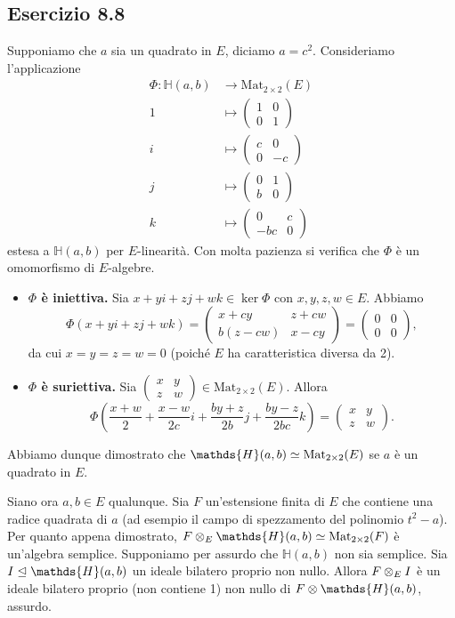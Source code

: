 \documentclass[a4paper]{article}
\newcommand*{\HH}{\mathds{H}}
\newcommand*{\Mat}{\text{Mat}_{2\times2}}
\newcommand*{\mattwo}[4]{\begin{pmatrix}#1&#2\\#3&#4\end{pmatrix}}
\begin{document}
\subsection*{Esercizio 8.8}
Supponiamo che $a$ sia un quadrato in $E$, diciamo $a=c^2$. Consideriamo l'applicazione
\begin{align*}
\Phi:\HH(a,b)&\longrightarrow\Mat(E)\\
1&\longmapsto\mattwo{1}{0}{0}{1}\\
i&\longmapsto\mattwo{c}{0}{0}{-c}\\
j&\longmapsto\mattwo{0}{1}{b}{0}\\
k&\longmapsto\mattwo{0}{c}{-bc}{0}
\end{align*}
estesa a $\HH(a,b)$ per $E$-linearità. Con molta pazienza si verifica che $\Phi$ è un omomorfismo di $E$-algebre.
\begin{itemize}
\item \textbf{$\Phi$ è iniettiva.} Sia $x+yi+zj+wk\in\ker\Phi$ con $x,y,z,w\in E$. Abbiamo
$$
\Phi(x+yi+zj+wk)=\mattwo{x+cy}{z+cw}{b(z-cw)}{x-cy}=\mattwo{0}{0}{0}{0},
$$
da cui $x=y=z=w=0$ (poiché $E$ ha caratteristica diversa da 2).
\item \textbf{$\Phi$ è suriettiva.} Sia $\mattwo{x}{y}{z}{w}\in\Mat(E)$. Allora
$$
\Phi\left(\frac{x+w}{2}+\frac{x-w}{2c}i+\frac{by+z}{2b}j+\frac{by-z}{2bc}k\right)=\mattwo{x}{y}{z}{w}.
$$
\end{itemize}
Abbiamo dunque dimostrato che $\HH(a,b)\iso\Mat(E)$ se $a$ è un quadrato in $E$.

Siano ora $a,b\in E$ qualunque. Sia $F$ un'estensione finita di $E$ che contiene una radice quadrata di $a$ (ad esempio il campo di spezzamento del polinomio $t^2-a$). Per quanto appena dimostrato, $F\tensor_E\HH(a,b)\iso\Mat(F)$ è un'algebra semplice. Supponiamo per assurdo che $\HH(a,b)$ non sia semplice. Sia $I\ideal\HH(a,b)$ un ideale bilatero proprio non nullo. Allora $F\otimes_E I$ è un ideale bilatero proprio (non contiene 1) non nullo di $F\tensor\HH(a,b)$, assurdo.
\end{document}
